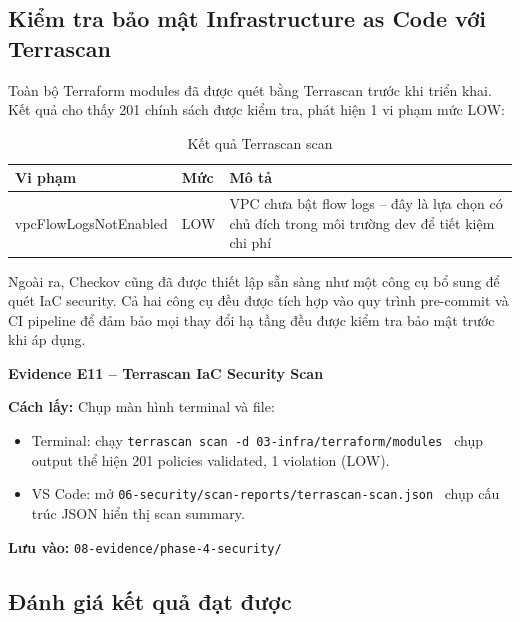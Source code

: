 \documentclass[13pt,a4paper,twoside]{extarticle}
\newcommand{\evidence}[1]{%
  \begin{evidencebox}
  #1
  \end{evidencebox}
}
\begin{document}
\subsection{Kiểm tra bảo mật Infrastructure as Code với Terrascan}

Toàn bộ Terraform modules đã được quét bằng Terrascan trước khi triển khai. Kết quả cho thấy 201 chính sách được kiểm tra, phát hiện 1 vi phạm mức LOW:

\begin{table}[H]
\centering
\begin{tabular}{@{}p{6cm} p{2cm} p{6cm}@{}}
\toprule
\textbf{Vi phạm} & \textbf{Mức} & \textbf{Mô tả} \\
\midrule
vpcFlowLogsNotEnabled & LOW & VPC chưa bật flow logs -- đây là lựa chọn có chủ đích trong môi trường dev để tiết kiệm chi phí \\
\bottomrule
\end{tabular}
\caption{Kết quả Terrascan scan}
\label{tab:terrascan}
\end{table}

Ngoài ra, Checkov cũng đã được thiết lập sẵn sàng như một công cụ bổ sung để quét IaC security. Cả hai công cụ đều được tích hợp vào quy trình pre-commit và CI pipeline để đảm bảo mọi thay đổi hạ tầng đều được kiểm tra bảo mật trước khi áp dụng.

\evidence{
\textbf{Evidence E11 -- Terrascan IaC Security Scan}

\smallskip
\textbf{Cách lấy:} Chụp màn hình terminal và file:
\begin{itemize}[leftmargin=*,nosep]
  \item Terminal: chạy \texttt{terrascan scan -d 03-infra/terraform/modules} \textrightarrow\ chụp output thể hiện 201 policies validated, 1 violation (LOW).
  \item VS Code: mở \texttt{06-security/scan-reports/terrascan-scan.json} \textrightarrow\ chụp cấu trúc JSON hiển thị scan summary.
\end{itemize}
\textbf{Lưu vào:} \texttt{08-evidence/phase-4-security/}
}

\subsection{Đánh giá kết quả đạt được}
\end{document}
